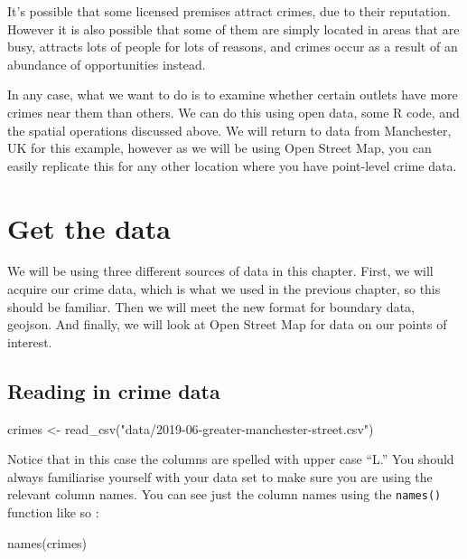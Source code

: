 \documentclass[
]{book}
\newenvironment{Shaded}{\begin{snugshade}}{\end{snugshade}}
\newcommand{\FunctionTok}[1]{\textcolor[rgb]{0.00,0.00,0.00}{#1}}
\newcommand{\NormalTok}[1]{#1}
\newcommand{\OtherTok}[1]{\textcolor[rgb]{0.56,0.35,0.01}{#1}}
\newcommand{\StringTok}[1]{\textcolor[rgb]{0.31,0.60,0.02}{#1}}
\begin{document}
It's possible that some licensed premises attract crimes, due to their reputation. However it is also possible that some of them are simply located in areas that are busy, attracts lots of people for lots of reasons, and crimes occur as a result of an abundance of opportunities instead.

In any case, what we want to do is to examine whether certain outlets have more crimes near them than others. We can do this using open data, some R code, and the spatial operations discussed above. We will return to data from Manchester, UK for this example, however as we will be using Open Street Map, you can easily replicate this for any other location where you have point-level crime data.

\hypertarget{get-the-data}{%
\section{Get the data}\label{get-the-data}}

We will be using three different sources of data in this chapter. First, we will acquire our crime data, which is what we used in the previous chapter, so this should be familiar. Then we will meet the new format for boundary data, geojson. And finally, we will look at Open Street Map for data on our points of interest.

\hypertarget{reading-in-crime-data}{%
\subsection{Reading in crime data}\label{reading-in-crime-data}}

\begin{Shaded}
\begin{Highlighting}[]
\NormalTok{crimes }\OtherTok{\textless{}{-}} \FunctionTok{read\_csv}\NormalTok{(}\StringTok{"data/2019{-}06{-}greater{-}manchester{-}street.csv"}\NormalTok{)}
\end{Highlighting}
\end{Shaded}

Notice that in this case the columns are spelled with upper case ``L.'' You should always familiarise yourself with your data set to make sure you are using the relevant column names. You can see just the column names using the \texttt{names()} function like so :

\begin{Shaded}
\begin{Highlighting}[]
\FunctionTok{names}\NormalTok{(crimes)}
\end{Highlighting}
\end{Shaded}
\end{document}
